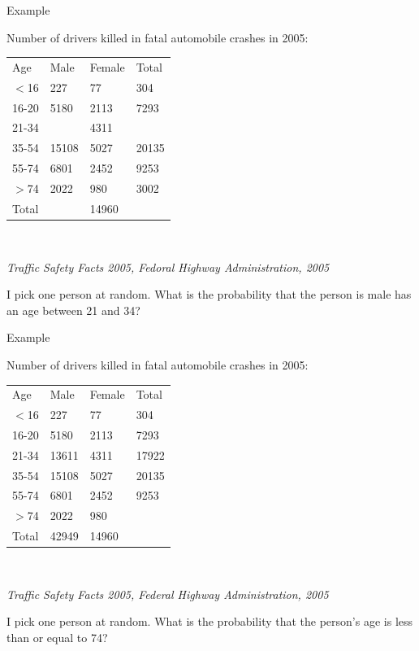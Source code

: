 \begin{frame}{Example}

  Number of drivers killed in fatal automobile crashes in 2005: \\
  \begin{tabular}{llll}
    Age & Male & Female & Total \\
    $<$16 & 227 & 77 & 304 \\
    16-20 & 5180 & 2113 & 7293 \\
    21-34 & \color{red}{13611} & 4311 & \color{green}{17922} \\
    35-54 & 15108 & 5027 & 20135 \\
    55-74 & 6801 & 2452 & 9253 \\
    $>$74   & 2022 & 980 & 3002 \\
    Total & \color{green}{42949} & 14960 & \color{red}{57909}
  \end{tabular} \\

  \vfill

  \textit{Traffic Safety Facts 2005, Fedoral Highway Administration,
    2005}

  \vfill

  I pick one person at random. What is the probability that the person
  is male {} has an age between 21 and 34?

  
  
\end{frame}


\begin{frame}{Example}

  Number of drivers killed in fatal automobile crashes in 2005: \\
  \begin{tabular}{llll}
    Age & Male & Female & Total \\
    $<$16 & 227 & 77 & 304 \\
    16-20 & 5180 & 2113 & 7293 \\
    21-34 & 13611 & 4311 & 17922 \\
    35-54 & 15108 & 5027 & 20135 \\
    55-74 & 6801 & 2452 & 9253 \\
    $>$74   & 2022 & 980 & \color{green}{3002} \\
    Total & 42949 & 14960 & \color{green}{57909}
  \end{tabular} \\

  \vfill

  \textit{Traffic Safety Facts 2005, Federal Highway Administration,
    2005}

  \vfill

  I pick one person at random. What is the probability that the person's
  age is less than or equal to 74?

  
  
\end{frame}


